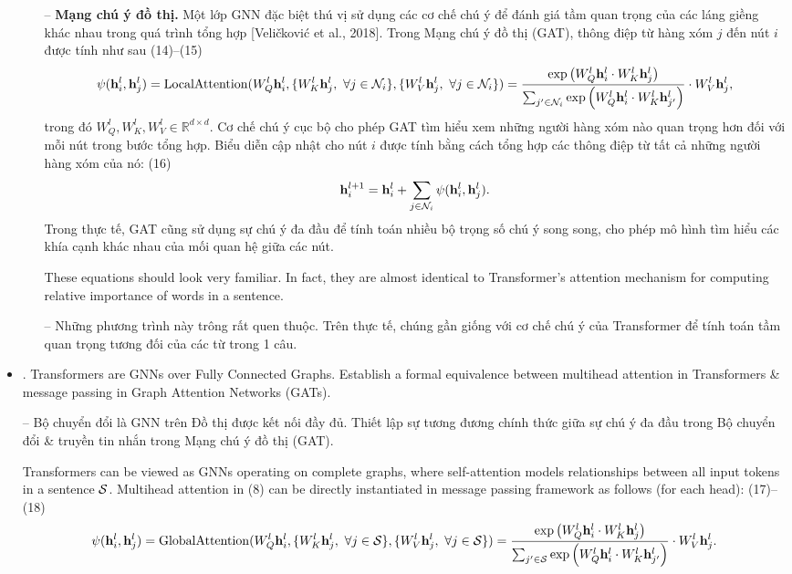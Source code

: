 \documentclass{article}
\begin{document}
\begin{itemize}
\begin{itemize}
        -- {\bf Mạng chú ý đồ thị.} Một lớp GNN đặc biệt thú vị sử dụng các cơ chế chú ý để đánh giá tầm quan trọng của các láng giềng khác nhau trong quá trình tổng hợp [Veličković et al., 2018]. Trong Mạng chú ý đồ thị (GAT), thông điệp từ hàng xóm $j$ đến nút $i$ được tính như sau (14)--(15)
        \begin{equation*}
            \psi({\bf h}_i^l,{\bf h}_j^l) = {\rm LocalAttention}(W_Q^l{\bf h}_i^l,\{W_K^l{\bf h}_j^l,\ \forall j\in{\cal N}_i\},\{W_V^l{\bf h}_j^l,\ \forall j\in{\cal N}_i\}) = \frac{\exp\left(W_Q^l{\bf h}_i^l\cdot W_K^l{\bf h}_j^l\right)}{\sum_{j'\in{\cal N}_i} \exp\left(W_Q^l{\bf h}_i^l\cdot W_K^l{\bf h}_{j'}^l\right)}\cdot W_V^l{\bf h}_j^l,
        \end{equation*}
        trong đó $W_Q^l,W_K^l,W_V^l\in\mathbb{R}^{d\times d}$. Cơ chế chú ý cục bộ cho phép GAT tìm hiểu xem những người hàng xóm nào quan trọng hơn đối với mỗi nút trong bước tổng hợp. Biểu diễn cập nhật cho nút $i$ được tính bằng cách tổng hợp các thông điệp từ tất cả những người hàng xóm của nó: (16)
        \begin{equation*}
            {\bf h}_i^{l + 1} = {\bf h}_i^l + \sum_{j\in{\cal N}_i} \psi({\bf h}_i^l,{\bf h}_j^l).
        \end{equation*}
        Trong thực tế, GAT cũng sử dụng sự chú ý đa đầu để tính toán nhiều bộ trọng số chú ý song song, cho phép mô hình tìm hiểu các khía cạnh khác nhau của mối quan hệ giữa các nút.
        
        These equations should look very familiar. In fact, they are almost identical to Transformer's attention mechanism for computing relative importance of words in a sentence.
        
        -- Những phương trình này trông rất quen thuộc. Trên thực tế, chúng gần giống với cơ chế chú ý của Transformer để tính toán tầm quan trọng tương đối của các từ trong 1 câu.
    \end{itemize}    
    \item {. Transformers are GNNs over Fully Connected Graphs.} Establish a formal equivalence between multihead attention in Transformers \& message passing in Graph Attention Networks (GATs).
    
    -- {\sf Bộ chuyển đổi là GNN trên Đồ thị được kết nối đầy đủ.} Thiết lập sự tương đương chính thức giữa sự chú ý đa đầu trong Bộ chuyển đổi \& truyền tin nhắn trong Mạng chú ý đồ thị (GAT).
    
    Transformers can be viewed as GNNs operating on complete graphs, where self-attention models relationships between all input tokens in a sentence ${\cal S}$. Multihead attention in (8) can be directly instantiated in message passing framework as follows (for each head): (17)--(18)
    \begin{equation*}
        \psi({\bf h}_i^l,{\bf h}_j^l) = {\rm GlobalAttention}(W_Q^l{\bf h}_i^l,\{W_K^l{\bf h}_j^l,\ \forall j\in{\cal S}\},\{W_V^l{\bf h}_j^l,\ \forall j\in{\cal S}\}) = \frac{\exp\left(W_Q^l{\bf h}_i^l\cdot W_K^l{\bf h}_j^l\right)}{\sum_{j'\in{\cal S}} \exp\left(W_Q^l{\bf h}_i^l\cdot W_K^l{\bf h}_{j'}^l\right)}\cdot W_V^l{\bf h}_j^l.
    \end{equation*}
    

\end{itemize}
\end{document}
